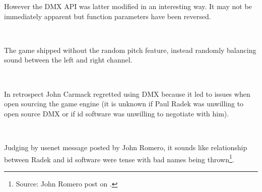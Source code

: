 However the DMX API was latter modified in an interesting way. It may not be immediately apparent but function  parameters have been reversed.\\
\par
{}\\
\par
 The game shipped without the random pitch feature, instead randomly balancing sound between the left and right channel.\\
\par
{}\\
\par
In retrospect John Carmack regretted using DMX because it led to issues when open sourcing the game engine (it is unknown if Paul Radek was unwilling to open source DMX or if id software was unwilling to negotiate with him).\\
\par
{}\\
\par
Judging by usenet message posted by John Romero, it sounds like relationship between Radek and id software were tense with bad names being thrown\footnote{Source: John Romero post on .}.\\



